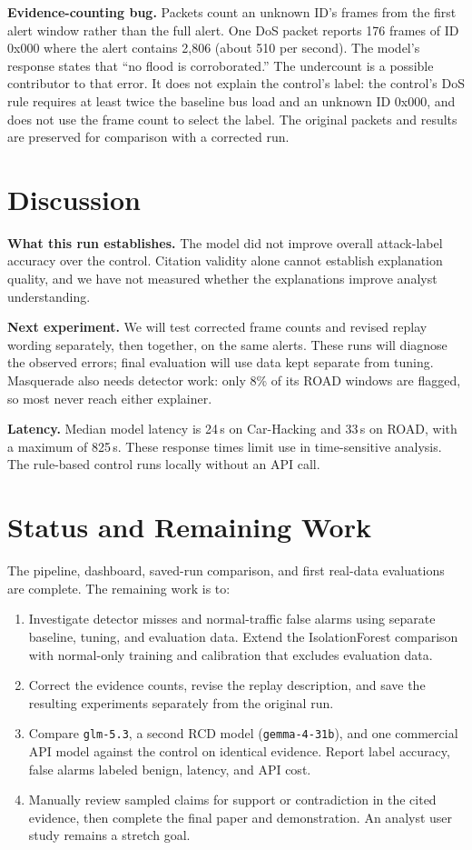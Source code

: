 \documentclass[sigconf]{acmart}
\begin{document}
\textbf{Evidence-counting bug.} Packets count an unknown ID's frames from the first alert window rather than the full alert. One DoS packet reports 176 frames of ID 0x000 where the alert contains 2,806 (about 510 per second). The model's response states that ``no flood is corroborated.'' The undercount is a possible contributor to that error. It does not explain the control's label: the control's DoS rule requires at least twice the baseline bus load and an unknown ID 0x000, and does not use the frame count to select the label. The original packets and results are preserved for comparison with a corrected run.

\balance
\section{Discussion}\label{sec:discuss}
\textbf{What this run establishes.} The model did not improve overall attack-label accuracy over the control. Citation validity alone cannot establish explanation quality, and we have not measured whether the explanations improve analyst understanding.

\textbf{Next experiment.} We will test corrected frame counts and revised replay wording separately, then together, on the same alerts. These runs will diagnose the observed errors; final evaluation will use data kept separate from tuning. Masquerade also needs detector work: only 8\% of its ROAD windows are flagged, so most never reach either explainer.

\textbf{Latency.} Median model latency is 24\,s on Car-Hacking and 33\,s on ROAD, with a maximum of 825\,s. These response times limit use in time-sensitive analysis. The rule-based control runs locally without an API call.

\section{Status and Remaining Work}
The pipeline, dashboard, saved-run comparison, and first real-data evaluations are complete. The remaining work is to:
\begin{enumerate}
  \item Investigate detector misses and normal-traffic false alarms using separate baseline, tuning, and evaluation data. Extend the IsolationForest comparison with normal-only training and calibration that excludes evaluation data.
  \item Correct the evidence counts, revise the replay description, and save the resulting experiments separately from the original run.
  \item Compare \texttt{glm-5.3}, a second RCD model (\texttt{gemma-4-31b}), and one commercial API model against the control on identical evidence. Report label accuracy, false alarms labeled benign, latency, and API cost.
  \item Manually review sampled claims for support or contradiction in the cited evidence, then complete the final paper and demonstration. An analyst user study remains a stretch goal.
\end{enumerate}
\end{document}
